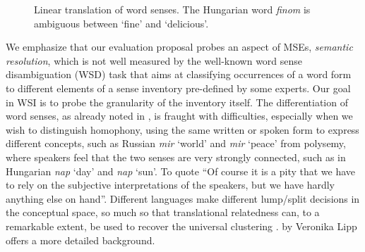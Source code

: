 \documentclass[11pt]{article}
\begin{document}
\begin{figure}[b]
    \centering
    \resizebox{\columnwidth}{!} {
    }
    \caption{Linear translation of word senses. The Hungarian word
        \emph{finom} is ambiguous between `fine' and `delicious'.}
        \label{fig:AdaGram}
\end{figure}

We emphasize that our evaluation proposal probes an aspect of MSEs,
\emph{semantic resolution}, which is not well measured by the well-known word
sense disambiguation (WSD) task that aims at classifying occurrences of a word
form to different elements of a sense inventory pre-defined by some experts.
Our goal in WSI is to probe the granularity of the inventory itself.  The
differentiation of word senses, as already noted in \cite{Borbely:2016}, is
fraught with difficulties, especially when we wish to distinguish homophony,
using the same written or spoken form to express different concepts, such as
Russian {\it mir} `world' and {\it mir} `peace' from polysemy, where speakers
feel that the two senses are very strongly connected, such as in Hungarian {\it
nap} `day' and {\it nap} `sun'.  To quote \cite{Zgusta:1971} ``Of course it is
a pity that we have to rely on the subjective interpretations of the speakers,
but we have hardly anything else on hand''. 
Different languages make different lump/split decisions in the conceptual
space, so much so that translational relatedness can, to a remarkable extent,
be used to recover the universal clustering \citep{Youn:2016}.
 by Veronika Lipp offers a more detailed background.
\end{document}

